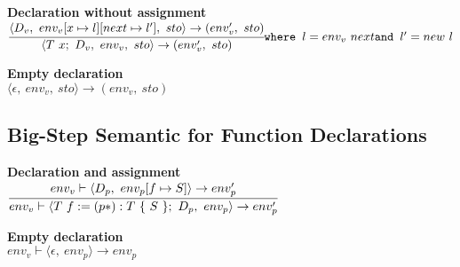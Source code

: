 \textbf{Declaration without assignment}\\
\begin{math}
	\cfrac
		{\langle D_v,\ env_v[x \mapsto l][next \mapsto l'],\ sto \rangle \rightarrow (env_v',\ sto)}
		{\langle T\ x;\ D_v,\ env_v,\ sto \rangle \rightarrow (env_v',\ sto)}\\
	\texttt{where } l = env_v\ next\\
	\texttt{and } l' = new\ l
\end{math}

\textbf{Empty declaration}\\
\begin{math}
	\langle \epsilon,\ env_v,\ sto \rangle \rightarrow (env_v,\ sto)
\end{math}





\subsection{Big-Step Semantic for Function Declarations}
\textbf{Declaration and assignment}\\
\begin{math}
	\cfrac
		{env_v \vdash \langle D_p,\ env_p[f \mapsto S] \rangle \rightarrow env_p'}
		{env_v \vdash \langle T\ f := (p*): T\ \{\ S\ \};\ D_p,\ env_p \rangle \rightarrow env_p'} %
\end{math}

\textbf{Empty declaration}\\
\begin{math}
env_v \vdash \langle \epsilon,\ env_p \rangle \rightarrow env_p
\end{math}



